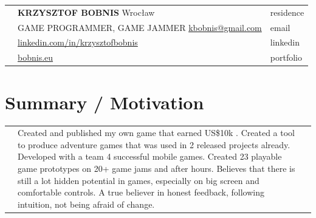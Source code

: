 \documentclass[12pt,a4paper]{article}
\begin{document}
\begin{tabular}  { >{\RaggedLeft}p{0cm} p{15.5cm}  p{2cm} }  
	& {\Large \textbf{KRZYSZTOF BOBNIS}} \hfill Wrocław & \textcolor{techColor}{residence} \\
	& GAME PROGRAMMER, GAME JAMMER \hfill  {\href{mailto:kbobnis@gmail.com}{kbobnis@gmail.com}} & \textcolor{techColor}{email} \\ 
	& \hfill {\href{https://www.linkedin.com/in/krzysztofbobnis}{linkedin.com/in/krzysztofbobnis}} & \textcolor{techColor}{linkedin} \\
	& \hfill {\href{http://bobnis.eu}{bobnis.eu}} & \textcolor{techColor}{portfolio} \\
\end{tabular}	 

\vspace{0.0cm}

\centering
\section*{Summary / Motivation}

	\begin{tabular}  { >{\RaggedLeft}p{0cm}  p{18cm}  p{0cm} }  

		 & Created and published my own game that earned US\$10k . Created a tool to produce adventure games that was used in 2 released projects already. Developed with a team 4 successful mobile games. Created 23 playable game prototypes on 20+ game jams and after hours. Believes that there is still a lot hidden potential in games, especially on big screen and comfortable controls. A true believer in honest feedback, following intuition, not being afraid of change. & \\
	\end{tabular}

\vspace*{1cm}
\end{document}
